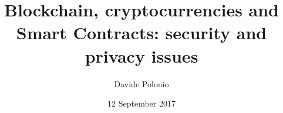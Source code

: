 \documentclass{beamer}
\title{Blockchain, cryptocurrencies and Smart Contracts: security and privacy
issues}
\author{Davide Polonio}
\date{12 September 2017}
\institute{University of Padova}
\begin{document}
\graphicspath{{res/image/}}


\end{document}
